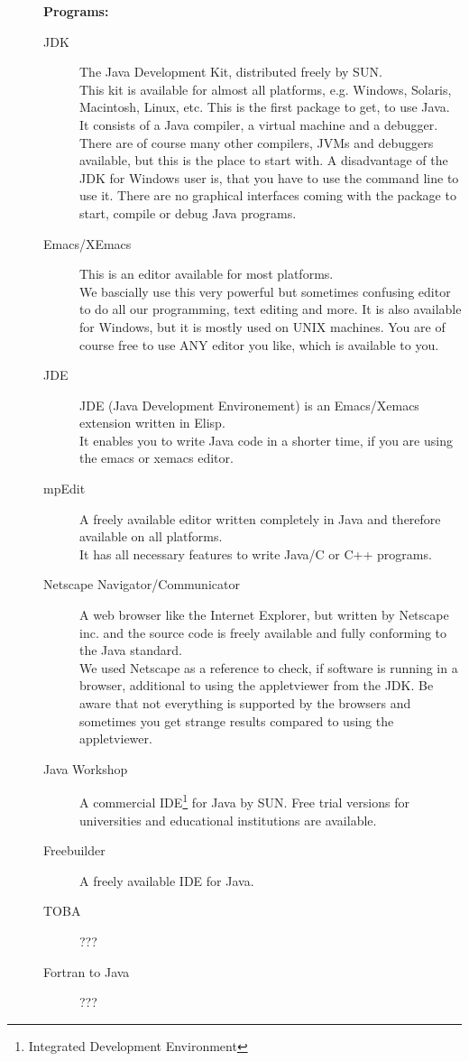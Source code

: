 \begin{description}
\item[] \textbf{Programs:} 
\begin{description}
\item[JDK] The Java Development Kit, distributed freely by SUN.\\
        This kit is available for almost all platforms, e.g. Windows,
        Solaris, Macintosh, Linux, etc. This is the first package to get,
        to use Java. It consists of a Java compiler, a virtual machine 
        and a debugger. There
        are of course many other compilers, JVMs and debuggers
        available, but this is the place to start with. A disadvantage
        of the JDK for Windows user is, that you have to use the
        command line to use it. There are no graphical interfaces  coming with the
        package to start, compile or debug Java programs.
\item[Emacs/XEmacs] This is an editor available for most platforms.\\
        We bascially use this very powerful but sometimes confusing
        editor to do all our programming, text editing and more. It is
        also available for Windows, but it is mostly used on UNIX machines.
        You are of course free to use ANY editor you like, which is available
        to you. 
\item[JDE] JDE (Java Development Environement) is an Emacs/Xemacs extension
        written in Elisp. \\
        It enables you to write Java code in a shorter time, if you are
        using the emacs or xemacs editor. 
\item[mpEdit] A freely available editor written completely in Java and
  therefore available on all platforms.\\ 
  It has all necessary features to write Java/C or C++ programs.
\item[Netscape Navigator/Communicator] A web browser like the Internet 
        Explorer, but written by Netscape inc. and the source code is
        freely available and fully conforming to the Java standard. \\
        We used Netscape as a reference to check, if software is running
        in a browser, additional to using the appletviewer from the JDK.
        Be aware that not everything is supported by the browsers and
        sometimes you get strange results compared to using the
        appletviewer.       
\item[Java Workshop] A commercial IDE\footnote{Integrated 
    Development Environment} 
  for Java by SUN. Free trial versions
  for universities and educational institutions are available.\\  
\item[Freebuilder] A freely available IDE for Java. \\
\item[TOBA] ???
\item[Fortran to Java] ???
\end{description}


\end{description}
